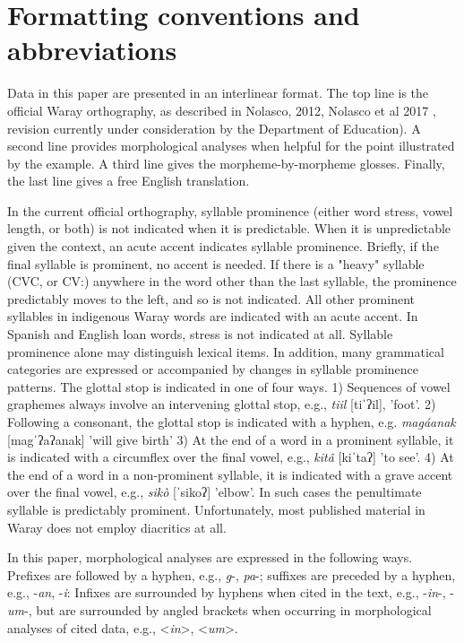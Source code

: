 \documentclass[output=paper]{langscibook}
\begin{document}
\section*{Formatting conventions and abbreviations}

Data in this paper are presented in an interlinear format. The top line is the official Waray orthography, as described in Nolasco, 2012, Nolasco et al 2017 \citet{NolascoEtAl2012}, revision currently under consideration by the Department of Education). A second line provides morphological analyses when helpful for the point illustrated by the example. A third line gives the morpheme-by-morpheme glosses. Finally, the last line gives a free English translation.

In the current official orthography, syllable prominence (either word stress, vowel length, or both) is not indicated when it is predictable. When it is unpredictable given the context, an acute accent indicates syllable prominence. Briefly, if the final syllable is prominent, no accent is needed. If there is a "heavy" syllable (CVC, or CV:) anywhere in the word other than the last syllable, the prominence predictably moves to the left, and so is not indicated. All other prominent syllables in indigenous Waray words are indicated with an acute accent. In Spanish and English loan words, stress is not indicated at all. Syllable prominence alone may distinguish lexical items. In addition, many grammatical categories are expressed or accompanied by changes in syllable prominence patterns. The glottal stop is indicated in one of four ways. 1) Sequences of vowel graphemes always involve an intervening glottal stop, e.g., \textit{tiil} [tiˈʔil], 'foot'. 2) Following a consonant, the glottal stop is indicated with a hyphen, e.g. \textit{mag\-áanak} [magˈʔaʔanak] 'will give birth' 3) At the end of a word in a prominent syllable, it is indicated with a circumflex over the final vowel, e.g., \textit{kitâ} [kiˈtaʔ] 'to see'. 4) At the end of a word in a non-prominent syllable, it is indicated with a grave accent over the final vowel, e.g., \textit{sikò} [ˈsikoʔ] 'elbow'. In such cases the penultimate syllable is predictably prominent. Unfortunately, most published material in Waray does not employ diacritics at all.

In this paper, morphological analyses are expressed in the following ways. Prefixes are followed by a hyphen, e.g., \textit{g}-, \textit{pa}-; suffixes are preceded by a hyphen, e.g., -\textit{an}, -\textit{i}: Infixes are surrounded by hyphens when cited in the text, e.g., \nobreakdash-\textit{in}{}-, -\textit{um}{}-, but are surrounded by angled brackets when occurring in morphological analyses of cited data, e.g., <\textit{in}>, <\textit{um}>. 
\end{document}
